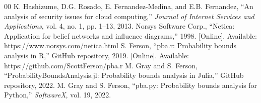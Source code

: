\documentclass[conference]{IEEEtran}
\begin{document}
\begin{thebibliography}{00}
 K. Hashizume, D.G. Rosado, E. Fernandez-Medina, and E.B. Fernandez, ``An analysis of security issues for cloud computing,'' \textit{Journal of Internet Services and Applications}, vol. 4, no. 1, pp. 1--13, 2013.
 Norsys Software Corp., ``Netica: Application for belief networks and influence diagrams,'' 1998. [Online]. Available: https://www.norsys.com/netica.html
 S. Ferson, ``pba.r: Probability bounds analysis in R,'' GitHub repository, 2019. [Online]. Available: https://github.com/ScottFerson/pba.r
 M. Gray and S. Ferson, ``ProbabilityBoundsAnalysis.jl: Probability bounds analysis in Julia,'' GitHub repository, 2022.
 M. Gray and S. Ferson, ``pba.py: Probability bounds analysis for Python,'' \textit{SoftwareX}, vol. 19, 2022.
\end{thebibliography}
\end{document}
